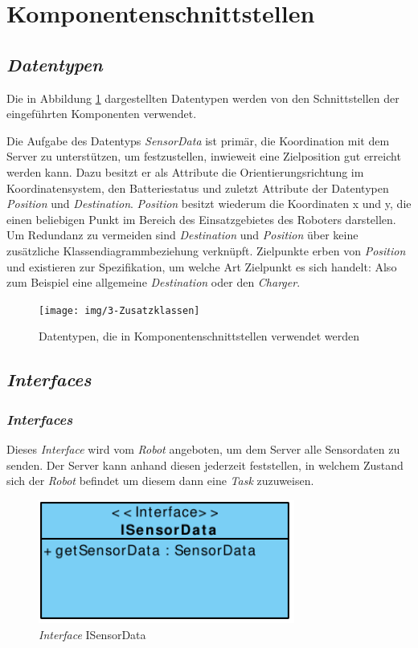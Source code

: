 \section{Komponentenschnittstellen}

\subsection{\textit{Datentypen}}
Die in Abbildung \ref{KomponentenschnittstellenDiagramm} dargestellten Datentypen werden von den Schnittstellen der eingeführten Komponenten verwendet. 

Die Aufgabe des Datentyps \emph{SensorData} ist primär, die Koordination mit dem Server zu unterstützen, um festzustellen, inwieweit eine Zielposition gut erreicht werden kann. Dazu besitzt er als Attribute die Orientierungsrichtung im Koordinatensystem, den Batteriestatus und zuletzt Attribute der Datentypen \emph{Position} und \emph{Destination}. \emph{Position} besitzt wiederum die Koordinaten x und y, die einen beliebigen Punkt im Bereich des Einsatzgebietes des Roboters darstellen. Um Redundanz zu vermeiden sind \emph{Destination} und \emph{Position} über keine zusätzliche Klassendiagrammbeziehung verknüpft. Zielpunkte erben von \emph{Position} und existieren zur Spezifikation, um welche Art Zielpunkt es sich handelt: Also zum Beispiel eine allgemeine \emph{Destination} oder den \emph{Charger}.
	
	\begin{figure}[H]
		\centering
		\texttt{[image: img/3-Zusatzklassen]}
		\caption{Datentypen, die in Komponentenschnittstellen verwendet werden}
		\label{KomponentenschnittstellenDiagramm}
	\end{figure}
	\pagebreak

\subsection{\textit{Interfaces}}
	\subsubsection{\textit{Interfaces}}
	Dieses \textit{Interface} wird vom \textit{Robot} angeboten, um dem Server alle Sensordaten zu senden. Der Server kann anhand diesen jederzeit feststellen, in welchem Zustand sich der \textit{Robot} befindet um diesem dann eine \textit{Task} zuzuweisen.
	\begin{figure}[H]
	\centering
	\includegraphics[width=0.75\textwidth]{img/1-Entwurf-3-1_ISensorData}
	\caption{\textit{Interface} ISensorData}
	\label{ISensorData}
	\end{figure}
	

